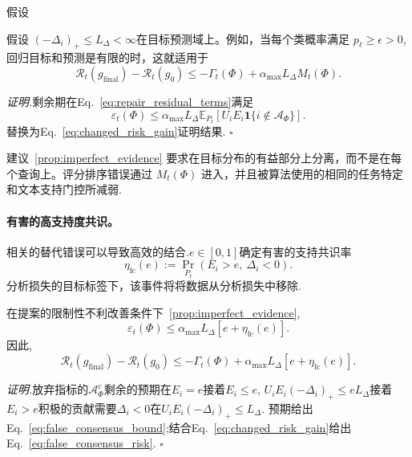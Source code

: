 假设 \begin{proposition}[不完美分分分] \label{prop:imperfect_evidence} 假设 $(-\Delta_i)_+\leq L_\Delta<\infty$在目标预测域上。例如，当每个类概率满足 $p_\ell\geq\epsilon>0$,回归目标和预测是有限的时，这就适用于
\begin{equation}
\mathcal R_t(g_{\mathrm{final}})-\mathcal R_t(g_0)
\leq
-\Gamma_t(\Phi)+\alpha_{\max}L_\Delta M_t(\Phi).
\label{eq:imperfect_evidence_risk}
\end{equation}
\end{proposition}

\noindent\emph{证明.}剩余期在Eq.~\eqref{eq:repair_residual_terms}满足\[
\varepsilon_t(\Phi)
\leq\alpha_{\max}L_\Delta
\mathbb E_{P_t}[U_iE_i\mathbf 1\{i\notin\mathcal A_\Phi\}].
\]替换为Eq.~\eqref{eq:changed_risk_gain}证明结果.
\hfill$\square$

建议~\ref{prop:imperfect_evidence} 要求在目标分布的有益部分上分离，而不是在每个查询上。评分排序错误通过 $M_t(\Phi)$ 进入，并且被算法使用的相同的任务特定和文本支持门控所减弱.

\paragraph{有害的高支持度共识。}
\label{app:harmful-consensus}

相关的替代错误可以导致高效的结合.$e\in[0,1]$确定有害的支持共识率
\begin{equation}
\eta_{\mathrm{fc}}(e)
:=\Pr_{P_t}(E_i>e,\ \Delta_i<0).
\label{eq:false_consensus_rate}
\end{equation}
分析损失的目标标签下，该事件将将数据从分析损失中移除.

\begin{proposition}[剩余风险的精炼]
\label{prop:false_consensus}在提案的限制性不利改善条件下~\ref{prop:imperfect_evidence},
\begin{equation}
\varepsilon_t(\Phi)
\leq\alpha_{\max}L_\Delta
\left[e+\eta_{\mathrm{fc}}(e)\right].
\label{eq:false_consensus_bound}
\end{equation}
因此,
\begin{equation}
\mathcal R_t(g_{\mathrm{final}})-\mathcal R_t(g_0)
\leq-\Gamma_t(\Phi)
+\alpha_{\max}L_\Delta
\left[e+\eta_{\mathrm{fc}}(e)\right].
\label{eq:false_consensus_risk}
\end{equation}
\end{proposition}

\noindent\emph{证明.}放弃指标的$\mathcal A_\Phi^c$剩余的预期在$E_i=e$接着$E_i\leq e$,
$U_iE_i(-\Delta_i)_+\leq eL_\Delta$接着$E_i>e$积极的贡献需要$\Delta_i<0$在$U_iE_i(-\Delta_i)_+\leq L_\Delta$.
预期给出Eq.~\eqref{eq:false_consensus_bound};结合Eq.~\eqref{eq:changed_risk_gain}给出Eq.~\eqref{eq:false_consensus_risk}. \hfill$\square$

